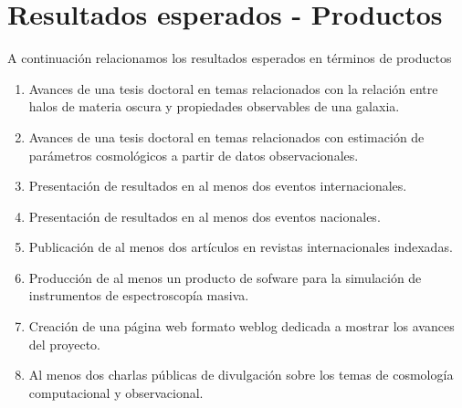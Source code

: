 
\section{Resultados esperados - Productos}


A continuaci\'on relacionamos los resultados esperados en términos de productos 

\begin{enumerate}

\item Avances de una tesis doctoral en temas relacionados con
  la relaci\'on entre halos de materia oscura y propiedades
  observables de una galaxia. 

\item Avances de una tesis doctoral en temas relacionados con
  estimaci\'on de par\'ametros cosmol\'ogicos a partir de datos
  observacionales. 


\item Presentaci\'on de resultados en al menos dos eventos
  internacionales.  

\item Presentaci\'on de resultados en al menos dos eventos nacionales.

\item Publicaci\'on de al menos dos art\'iculos en revistas
  internacionales indexadas. 

\item Producci\'on de al menos un producto de sofware para la
  simulaci\'on de instrumentos de espectroscop\'ia masiva.  

\item Creaci\'on de una p\'agina web formato weblog dedicada a mostrar
  los avances del proyecto. 

\item Al menos dos charlas p\'ublicas de divulgaci\'on sobre los temas
  de cosmolog\'ia computacional y observacional. 

\end{enumerate}
